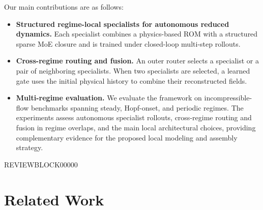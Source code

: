 \documentclass{article}
\begin{document}
Our main contributions are as follows:
\begin{itemize}

\item \textbf{Structured regime-local specialists for autonomous reduced dynamics.} Each specialist combines a physics-based ROM with a structured sparse MoE closure and is trained under closed-loop multi-step rollouts.

\item \textbf{Cross-regime routing and fusion.}
An outer router selects a specialist or a pair of neighboring specialists. When two specialists are selected, a learned gate uses the initial physical history to combine their reconstructed fields.

\item \textbf{Multi-regime evaluation.}
We evaluate the framework on  incompressible-flow benchmarks spanning steady, Hopf-onset, and periodic regimes. The experiments assess autonomous specialist rollouts, cross-regime routing and fusion in regime overlaps, and the main local architectural choices, providing complementary evidence for the proposed local modeling and assembly strategy.

\end{itemize}




\par


REVIEWBLOCK00000


\par



\section{Related Work}
\end{document}
